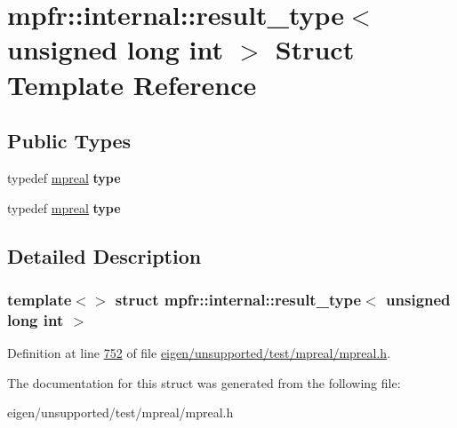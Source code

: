 \hypertarget{structmpfr_1_1internal_1_1result__type_3_01unsigned_01long_01int_01_4}{}\section{mpfr\+:\+:internal\+:\+:result\+\_\+type$<$ unsigned long int $>$ Struct Template Reference}
\label{structmpfr_1_1internal_1_1result__type_3_01unsigned_01long_01int_01_4}
\subsection*{Public Types}
\begin{DoxyCompactItemize}
\item 
\mbox{\label{structmpfr_1_1internal_1_1result__type_3_01unsigned_01long_01int_01_4_a8d433a8cf12e09411e22b948abca33b8}} 
typedef \hyperlink{classmpfr_1_1mpreal}{mpreal} {\bfseries type}
\item 
\mbox{\label{structmpfr_1_1internal_1_1result__type_3_01unsigned_01long_01int_01_4_a8d433a8cf12e09411e22b948abca33b8}} 
typedef \hyperlink{classmpfr_1_1mpreal}{mpreal} {\bfseries type}
\end{DoxyCompactItemize}


\subsection{Detailed Description}
\subsubsection*{template$<$$>$\newline
struct mpfr\+::internal\+::result\+\_\+type$<$ unsigned long int $>$}



Definition at line \hyperlink{eigen_2unsupported_2test_2mpreal_2mpreal_8h_source_l00752}{752} of file \hyperlink{eigen_2unsupported_2test_2mpreal_2mpreal_8h_source}{eigen/unsupported/test/mpreal/mpreal.\+h}.



The documentation for this struct was generated from the following file\+:\begin{DoxyCompactItemize}
\item 
eigen/unsupported/test/mpreal/mpreal.\+h\end{DoxyCompactItemize}
